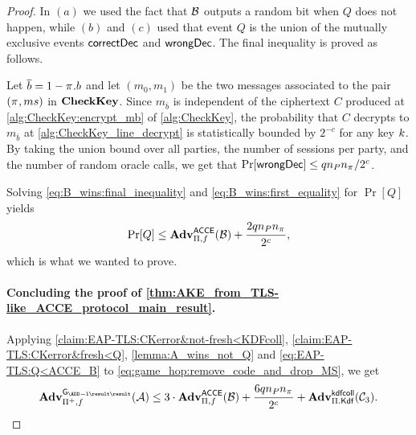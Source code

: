 \begin{proof}
In $(a)$ we used the fact that $\A[B]$ outputs a random bit when $Q$ does not happen,
while $(b)$ and $(c)$ used that event $Q$ is the union of the mutually exclusive events $\correct$ and $\wrong$.
The final inequality is proved as follows.


Let $\overline{b} = 1 - \oracle.b$ and let $(m_0,m_1)$ be the two messages associated to the pair $(\oracle,ms)$ in $\CK$.
Since $m_{\overline{b}}$ is independent of the ciphertext $C$ produced at \cref{alg:CheckKey:encrypt_mb} of \cref{alg:CheckKey},
the probability that $C$ decrypts to $m_{\overline{b}}$ at \cref{alg:CheckKey_line_decrypt} is statistically bounded by $2^{-c}$ for any key $\key$.
By taking the union bound over all parties, 
the number of sessions per party,
and the number of random oracle calls,
we get that $\Pr[\wrong] \leq q \numparties \numsessions / 2^{c}$.

Solving \eqref{eq:B_wins:final_inequality} and \eqref{eq:B_wins:first_equality} for $\Pr[Q]$ yields
\begin{equation}\label{eq:EAP-TLS:Q<ACCE_B}
	\Pr[Q] \leq \adv_{\protocol,f}^{\acce}(\A[B]) + \frac{2 \unionbound}{2^{c}} , 
\end{equation}
which is what we wanted to prove.

 

\paragraph{Concluding the proof of \texorpdfstring{\cref{thm:AKE_from_TLS-like_ACCE_protocol_main_result}}{Theorem~\ref{thm:AKE_from_TLS-like_ACCE_protocol_main_result}}.}


Applying \cref{claim:EAP-TLS:CKerror&not-fresh<KDFcoll},  
\cref{claim:EAP-TLS:CKerror&fresh<Q},
\cref{lemma:A_wins_not_Q}
and 
\cref{eq:EAP-TLS:Q<ACCE_B}
to \cref{eq:game_hop:remove_code_and_drop_MS},
we get
\begin{gather}\label{eq:game_hop:remove_code_and_drop_MS_expanded}
	\adv_{\protocolderived,f}^{\mathsf{G_{\prevgame{}}}}(\A)
		\leq 3 \cdot \adv_{\protocol,f}^{\acce}(\A[B])
		+ \frac{6 \unionbound}{2^{c}}
		+\adv_{\protocol.\mathsf{Kdf}}^{\kdfcoll}(\A[C]_3) .
\end{gather}


\end{proof}
